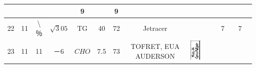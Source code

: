 \documentclass[10pt]{article}
\begin{document}
\begin{center}
\begin{tabular}{|c|c|c|c|c|c|c|c|c|c|c|c|c|c|c|}
 &  &  &  & 9 &  & 9 &  \\
\hline
22 & 11 & \textbackslash ％ & \(\sqrt{3} 05\) & TG & 40 & 72 & Jetracer &  &  &  & 7 &  & 7 &  \\
\hline
23 & 11 & 11 & －6 & \(C H O\) & 7.5 & 73 & TOFRET, EUA AUDERSON & \includegraphics[max width=\textwidth]{2025_02_27_dd68c3d38de88f0516d9g-009(10)}

\end{tabular}
\end{center}
\end{document}
